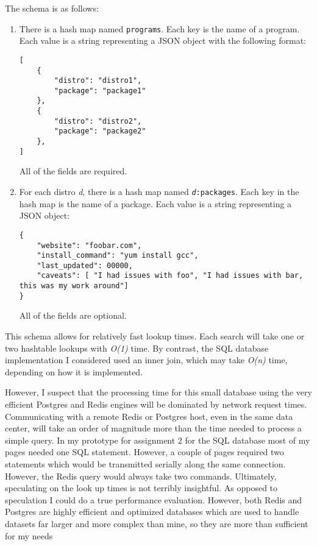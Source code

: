 \documentclass[12pt]{article}
\begin{document}
The schema is as follows:
\begin{enumerate}
    \item There is a hash map named \texttt{programs}. Each key is the name of a program. Each value is a string representing a JSON object with the following format:

\begin{lstlisting}
[
	{
		"distro": "distro1",
		"package": "package1"
	},
	{
		"distro": "distro2",
		"package": "package2"
	},
]
\end{lstlisting}
    All of the fields are required.

    \item For each distro \textit{d}, there is a hash map named \texttt{\textit{d}:packages}. Each key in the hash map is the name of a package. Each value is a string representing a JSON object:

\begin{lstlisting}
{
	"website": "foobar.com",
	"install_command": "yum install gcc",
	"last_updated": 00000,
	"caveats": [ "I had issues with foo", "I had issues with bar, this was my work around"]
}
\end{lstlisting}
    All of the fields are optional.

\end{enumerate}

This schema allows for relatively fast lookup times. Each search will take one or two hashtable lookups with \textit{O(1)} time. By contrast, the SQL database implementation I considered used an inner join, which may take \textit{O(n)} time, depending on how it is implemented.

However, I suspect that the processing time for this small database using the very efficient Postgres and Redis engines will be dominated by network request times. Communicating with a remote Redis or Postgres host, even in the same data center, will take an order of magnitude more than the time needed to process a simple query. In my prototype for assignment 2 for the SQL database most of my pages needed one SQL statement. However, a couple of pages required two statements which would be transmitted serially along the same connection. However, the Redis query would always take two commands. Ultimately, speculating on the look up times is not terribly insightful. As opposed to speculation I could do a true performance evaluation. However, both Redis and Postgres are highly efficient and optimized databases which are used to handle datasets far larger and more complex than mine, so they are more than sufficient for my needs
\end{document}
